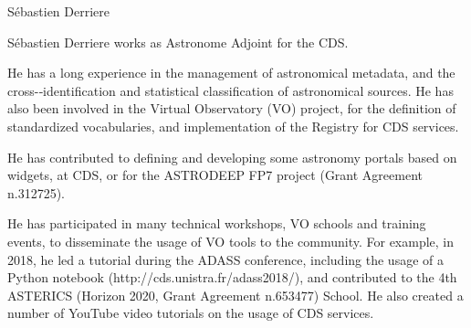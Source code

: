 \begin{participant}[type=R,PM=2,gender=male]{S\'ebastien Derriere}




  \par S\'ebastien Derriere works as Astronome Adjoint for the CDS.

  \par He has a long experience in the management of astronomical metadata, and the cross-­‐identification and statistical classification of astronomical sources. He has also been involved in the Virtual Observatory (VO) project, for the definition of standardized vocabularies, and implementation of the Registry for CDS services.

  \par He has contributed to defining and developing some astronomy portals based on widgets, at CDS, or for the ASTRODEEP FP7 project (Grant Agreement n.312725).

  \par He has participated in many technical workshops, VO schools and training events, to disseminate the usage of VO tools to the community. For example, in 2018, he led a tutorial during the ADASS conference, including the usage of a Python notebook (http://cds.unistra.fr/adass2018/), and contributed to the 4th ASTERICS (Horizon 2020,  Grant Agreement n.653477) School. He also created a number of YouTube video tutorials on the usage of CDS services.

\end{participant}

